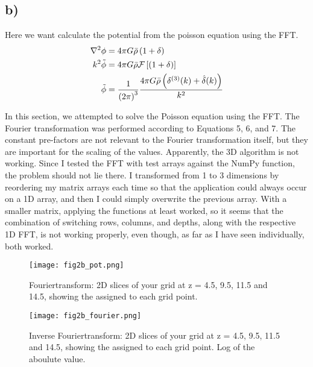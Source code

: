 \subsection{b)}
Here we want calculate the potential from the poisson equation using the FFT. 
\begin{align}
    \nabla^2\phi &= 4 \pi G \Bar{\rho} \left({1+ \delta}\right)\\
    k^2 \Tilde{\phi} &= 4\pi G \Bar{\rho} \mathcal{F}\left[\left({1+\delta}\right)\right] \\
     \Tilde{\phi} &= \frac{1}{\left({2 \pi}\right)^3}\frac{4\pi G \Bar{\rho} \left({\delta^{(3)}(k) + \hat{\delta}(k)}\right)}{k^2}
\end{align}


In this section, we attempted to solve the Poisson equation using the FFT. The Fourier transformation was performed according to Equations 5, 6, and 7. The constant pre-factors are not relevant to the Fourier transformation itself, but they are important for the scaling of the values. Apparently, the 3D algorithm is not working. Since I tested the FFT with test arrays against the NumPy function, the problem should not lie there. I transformed from 1 to 3 dimensions by reordering my matrix arrays each time so that the application could always occur on a 1D array, and then I could simply overwrite the previous array. With a smaller matrix, applying the functions at least worked, so it seems that the combination of switching rows, columns, and depths, along with the respective 1D FFT, is not working properly, even though, as far as I have seen individually, both worked.

\begin{figure}[h!]
    \centering
    \texttt{[image: fig2b\_pot.png]}
    \caption{Fouriertransform: 2D slices of your grid at z = 4.5, 9.5, 11.5 and
    14.5, showing the assigned to each grid point.}
\end{figure}


\begin{figure}[h!]
    \centering
    \texttt{[image: fig2b\_fourier.png]}
    \caption{Inverse Fouriertransform: 2D slices of your grid at z = 4.5, 9.5, 11.5 and
    14.5, showing the assigned to each grid point. Log of the aboulute value.}
\end{figure}






